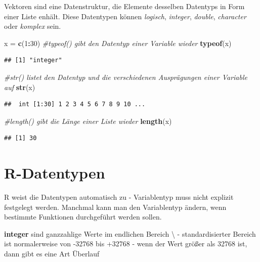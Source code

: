 \documentclass[]{book}
\newenvironment{Shaded}{\begin{snugshade}}{\end{snugshade}}
\newcommand{\KeywordTok}[1]{\textcolor[rgb]{0.13,0.29,0.53}{\textbf{#1}}}
\newcommand{\DecValTok}[1]{\textcolor[rgb]{0.00,0.00,0.81}{#1}}
\newcommand{\StringTok}[1]{\textcolor[rgb]{0.31,0.60,0.02}{#1}}
\newcommand{\CommentTok}[1]{\textcolor[rgb]{0.56,0.35,0.01}{\textit{#1}}}
\newcommand{\OperatorTok}[1]{\textcolor[rgb]{0.81,0.36,0.00}{\textbf{#1}}}
\newcommand{\NormalTok}[1]{#1}
\begin{document}
Vektoren sind eine Datenstruktur, die Elemente desselben Datentyps in
Form einer Liste enhält. Diese Datentypen können \emph{logisch},
\emph{integer}, \emph{double}, \emph{character} oder \emph{komplex}
sein.

\begin{Shaded}
\begin{Highlighting}[]
\NormalTok{x =}\StringTok{ }\KeywordTok{c}\NormalTok{(}\DecValTok{1}\OperatorTok{:}\DecValTok{30}\NormalTok{)}
\CommentTok{#typeof() gibt den Datentyp einer Variable wieder }
\KeywordTok{typeof}\NormalTok{(x)}
\end{Highlighting}
\end{Shaded}

\begin{verbatim}
## [1] "integer"
\end{verbatim}

\begin{Shaded}
\begin{Highlighting}[]
\CommentTok{#str() listet den Datentyp und die verschiedenen Ausprägungen einer Variable auf}
\KeywordTok{str}\NormalTok{(x)}
\end{Highlighting}
\end{Shaded}

\begin{verbatim}
##  int [1:30] 1 2 3 4 5 6 7 8 9 10 ...
\end{verbatim}

\begin{Shaded}
\begin{Highlighting}[]
\CommentTok{#length() gibt die Länge einer Liste wieder}
\KeywordTok{length}\NormalTok{(x)}
\end{Highlighting}
\end{Shaded}

\begin{verbatim}
## [1] 30
\end{verbatim}

\section{R-Datentypen}\label{r-datentypen}

R weist die Datentypen automatisch zu - Variablentyp muss nicht explizit
festgelegt werden. Manchmal kann man den Variablentyp ändern, wenn
bestimmte Funktionen durchgeführt werden sollen.

\textbf{integer} sind ganzzahlige Werte im endlichen Bereich
\textbackslash{} - standardisierter Bereich ist normalerweise von -32768
bis +32768 - wenn der Wert größer als 32768 ist, dann gibt es eine Art
Überlauf
\end{document}
